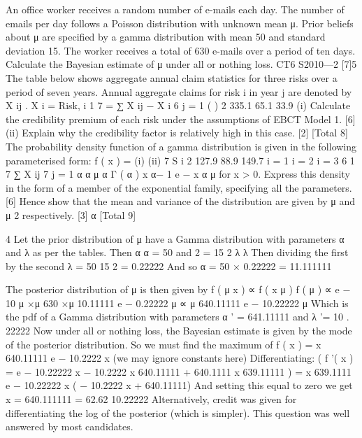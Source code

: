\documentclass[a4paper,12pt]{article}
\begin{document}
 

An office worker receives a random number of e-mails each day. The number of emails per day follows a Poisson distribution with unknown mean μ. Prior beliefs about μ are specified by a gamma distribution with mean 50 and standard deviation
15. The worker receives a total of 630 e-mails over a period of ten days.
Calculate the Bayesian estimate of μ under all or nothing loss.
CT6 S2010—2
[7]5
The table below shows aggregate annual claim statistics for three risks over a period
of seven years. Annual aggregate claims for risk i in year j are denoted by X ij .
X i =
Risk, i
1 7
= ∑ X ij − X i
6 j = 1
(
)
2
335.1
65.1
33.9
(i) Calculate the credibility premium of each risk under the assumptions of EBCT
Model 1.
[6]
(ii) Explain why the credibility factor is relatively high in this case.
[2]
[Total 8]
The probability density function of a gamma distribution is given in the following
parameterised form:
f ( x ) =
(i)
(ii)
7
S i 2
127.9
88.9
149.7
i = 1
i = 2
i = 3
6
1 7
∑ X ij
7 j = 1
α α
μ α Γ ( α )
x
α− 1
e
−
x α
μ
for x > 0.
Express this density in the form of a member of the exponential family,
specifying all the parameters.
[6]
Hence show that the mean and variance of the distribution are given by μ and
μ 2
respectively.
[3]
α
[Total 9]

\newpage

4
Let the prior distribution of μ have a Gamma distribution with parameters α and λ
as per the tables.
Then
α
α
= 50 and 2 = 15 2
λ
λ
Then dividing the first by the second λ =
50
15 2
= 0.22222
And so α = 50 × 0.22222 = 11.111111


The posterior distribution of μ is then given by
f ( μ x ) ∝ f ( x μ ) f ( μ )
∝ e − 10 μ ×μ 630 ×μ 10.11111 e − 0.22222 μ
∝ μ 640.11111 e − 10.22222 μ
Which is the pdf of a Gamma distribution with parameters α ' = 641.11111 and
λ '= 10 . 22222
Now under all or nothing loss, the Bayesian estimate is given by the mode of the
posterior distribution. So we must find the maximum of
f ( x ) = x 640.11111 e − 10.2222 x (we may ignore constants here)
Differentiating:
(
f '( x ) = e − 10.22222 x − 10.2222 x 640.11111 + 640.1111 x 639.11111
)
= x 639.1111 e − 10.22222 x ( − 10.2222 x + 640.11111)
And setting this equal to zero we get
x =
640.111111
= 62.62
10.22222
Alternatively, credit was given for differentiating the log of the posterior (which is simpler).
This question was well answered by most candidates.
\end{document}
